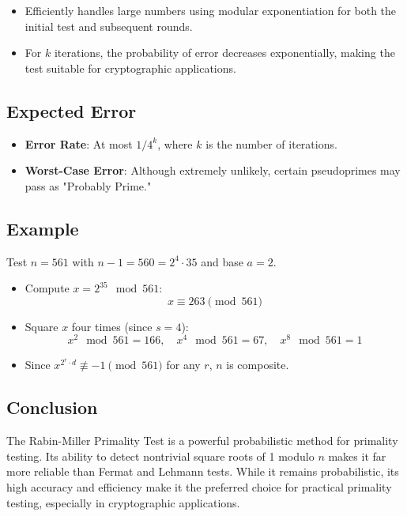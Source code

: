 \documentclass[12pt]{article}
\begin{document}
\begin{itemize}
    \item Efficiently handles large numbers using modular exponentiation for both the initial test and subsequent rounds.
    \item For \( k \) iterations, the probability of error decreases exponentially, making the test suitable for cryptographic applications.
\end{itemize}

\subsection*{Expected Error}

\begin{itemize}
    \item \textbf{Error Rate}: At most \( 1 / 4^k \), where \( k \) is the number of iterations.
    \item \textbf{Worst-Case Error}: Although extremely unlikely, certain pseudoprimes may pass as "Probably Prime."
\end{itemize}

\subsection*{Example}

Test \( n = 561 \) with \( n-1 = 560 = 2^4 \cdot 35 \) and base \( a = 2 \).

\begin{itemize}
    \item Compute \( x = 2^{35} \mod 561 \):
    \[
    x \equiv 263 \pmod{561}
    \]
    \item Square \( x \) four times (since \( s = 4 \)):
    \[
    x^2 \mod 561 = 166, \quad x^4 \mod 561 = 67, \quad x^8 \mod 561 = 1
    \]
    \item Since \( x^{2^r \cdot d} \not\equiv -1 \pmod{561} \) for any \( r \), \( n \) is composite.
\end{itemize}

\subsection*{Conclusion}

The Rabin-Miller Primality Test is a powerful probabilistic method for primality testing. Its ability to detect nontrivial square roots of 1 modulo \( n \) makes it far more reliable than Fermat and Lehmann tests. While it remains probabilistic, its high accuracy and efficiency make it the preferred choice for practical primality testing, especially in cryptographic applications.
\end{document}
